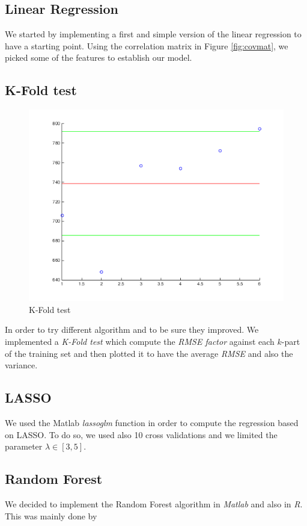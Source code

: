 \documentclass[a4paper, 11pt]{article}
\begin{document}
\subsection*{Linear Regression}
We started by implementing a first and simple version of the linear regression to have a starting point.
Using the correlation matrix in Figure \ref{fig:covmat}, we picked some of the features to establish our model.

\subsection*{K-Fold test}

\begin{figure}
	\centering
	\includegraphics[width=\linewidth]{kfold}
	\caption{K-Fold test}
	\label{fig:kfold}
\end{figure}
	
In order to try different algorithm and to be sure they improved.
We implemented a \textit{K-Fold test} which compute the \textit{RMSE factor} against each $k$-part of the training set and then plotted it to have the average \textit{RMSE} and also the variance. 

\subsection*{LASSO}
We used the Matlab \textit{lassoglm} function in order to compute the regression based on LASSO.
To do so, we used also 10 cross validations and we limited the parameter $\lambda \in [3,5]$.

\subsection*{Random Forest}
We decided to implement the Random Forest algorithm in \textit{Matlab} and also in \textit{R}.
This was mainly done by 
\end{document}
